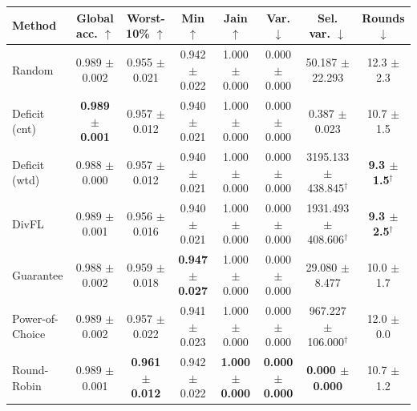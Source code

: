 \begin{tabular}{lccccccc}
\toprule
Method & Global acc. $\uparrow$ & Worst-10\% $\uparrow$ & Min $\uparrow$ & Jain $\uparrow$ & Var. $\downarrow$ & Sel. var. $\downarrow$ & Rounds $\downarrow$ \\
\midrule
Random & 0.989 $\pm$ 0.002 & 0.955 $\pm$ 0.021 & 0.942 $\pm$ 0.022 & 1.000 $\pm$ 0.000 & 0.000 $\pm$ 0.000 & 50.187 $\pm$ 22.293 & 12.3 $\pm$ 2.3 \\
Deficit (cnt) & \textbf{0.989 $\pm$ 0.001} & 0.957 $\pm$ 0.012 & 0.940 $\pm$ 0.021 & 1.000 $\pm$ 0.000 & 0.000 $\pm$ 0.000 & 0.387 $\pm$ 0.023 & 10.7 $\pm$ 1.5 \\
Deficit (wtd) & 0.988 $\pm$ 0.000 & 0.957 $\pm$ 0.012 & 0.940 $\pm$ 0.021 & 1.000 $\pm$ 0.000 & 0.000 $\pm$ 0.000 & 3195.133 $\pm$ 438.845$^\dagger$ & \textbf{9.3 $\pm$ 1.5}$^\dagger$ \\
DivFL & 0.989 $\pm$ 0.001 & 0.956 $\pm$ 0.016 & 0.940 $\pm$ 0.021 & 1.000 $\pm$ 0.000 & 0.000 $\pm$ 0.000 & 1931.493 $\pm$ 408.606$^\dagger$ & \textbf{9.3 $\pm$ 2.5}$^\dagger$ \\
Guarantee & 0.988 $\pm$ 0.002 & 0.959 $\pm$ 0.018 & \textbf{0.947 $\pm$ 0.027} & 1.000 $\pm$ 0.000 & 0.000 $\pm$ 0.000 & 29.080 $\pm$ 8.477 & 10.0 $\pm$ 1.7 \\
Power-of-Choice & 0.989 $\pm$ 0.002 & 0.957 $\pm$ 0.022 & 0.941 $\pm$ 0.023 & 1.000 $\pm$ 0.000 & 0.000 $\pm$ 0.000 & 967.227 $\pm$ 106.000$^\dagger$ & 12.0 $\pm$ 0.0 \\
Round-Robin & 0.989 $\pm$ 0.001 & \textbf{0.961 $\pm$ 0.012} & 0.942 $\pm$ 0.022 & \textbf{1.000 $\pm$ 0.000} & \textbf{0.000 $\pm$ 0.000} & \textbf{0.000 $\pm$ 0.000} & 10.7 $\pm$ 1.2 \\
\bottomrule
\end{tabular}
